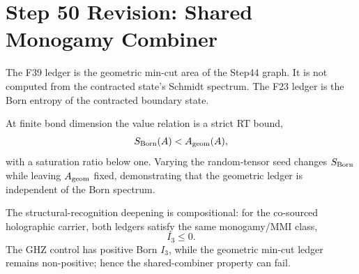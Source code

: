 \section*{Step 50 Revision: Shared Monogamy Combiner}

The F39 ledger is the geometric min-cut area of the Step44 graph. It is not
computed from the contracted state's Schmidt spectrum. The F23 ledger is the
Born entropy of the contracted boundary state.

At finite bond dimension the value relation is a strict RT bound,
\[
S_{\rm Born}(A) < A_{\rm geom}(A),
\]
with a saturation ratio below one. Varying the random-tensor seed changes
\(S_{\rm Born}\) while leaving \(A_{\rm geom}\) fixed, demonstrating that the
geometric ledger is independent of the Born spectrum.

The structural-recognition deepening is compositional: for the co-sourced
holographic carrier, both ledgers satisfy the same monogamy/MMI class,
\[
I_3 \le 0.
\]
The GHZ control has positive Born \(I_3\), while the geometric min-cut ledger
remains non-positive; hence the shared-combiner property can fail.
